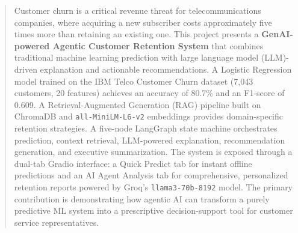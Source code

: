 \begin{abstract}
Customer churn is a critical revenue threat for telecommunications companies, where
acquiring a new subscriber costs approximately five times more than retaining an
existing one. This project presents a \textbf{GenAI-powered Agentic Customer Retention
System} that combines traditional machine learning prediction with large language model
(LLM)-driven explanation and actionable recommendations. A Logistic Regression model
trained on the IBM Telco Customer Churn dataset (7,043 customers, 20 features) achieves
an accuracy of 80.7\% and an F1-score of 0.609. A Retrieval-Augmented Generation (RAG)
pipeline built on ChromaDB and \texttt{all-MiniLM-L6-v2} embeddings provides domain-specific
retention strategies. A five-node LangGraph state machine orchestrates prediction, context
retrieval, LLM-powered explanation, recommendation generation, and executive summarization.
The system is exposed through a dual-tab Gradio interface: a Quick Predict tab for instant
offline predictions and an AI Agent Analysis tab for comprehensive, personalized retention
reports powered by Groq's \texttt{llama3-70b-8192} model. The primary contribution is
demonstrating how agentic AI can transform a purely predictive ML system into a prescriptive
decision-support tool for customer service representatives.
\end{abstract}
